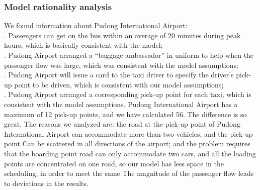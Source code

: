 \subsubsection{Model rationality analysis}
We found information about Pudong International Airport:\\
. Passengers can get on the bus within an average of 20 minutes during peak hours, which is basically consistent with the model;\\
. Pudong Airport arranged a “baggage ambassador” in uniform to help when the passenger flow was large, which was consistent with the model assumptions;\\
. Pudong Airport will issue a card to the taxi driver to specify the driver's pick-up point to be driven, which is consistent with our model assumptions;\\
. Pudong Airport arranged a corresponding pick-up point for each taxi, which is consistent with the model assumptions. Pudong International Airport has a maximum of 12 pick-up points, and we have calculated 56. The difference is so great. The reasons we analyzed are: the road at the pick-up point of Pudong International Airport can accommodate more than two vehicles, and the pick-up point Can be scattered in all directions of the airport; and the problem requires that the boarding point road can only accommodate two cars, and all the loading points are concentrated on one road, so our model has less space in the scheduling, in order to meet the same The magnitude of the passenger flow leads to deviations in the results.






